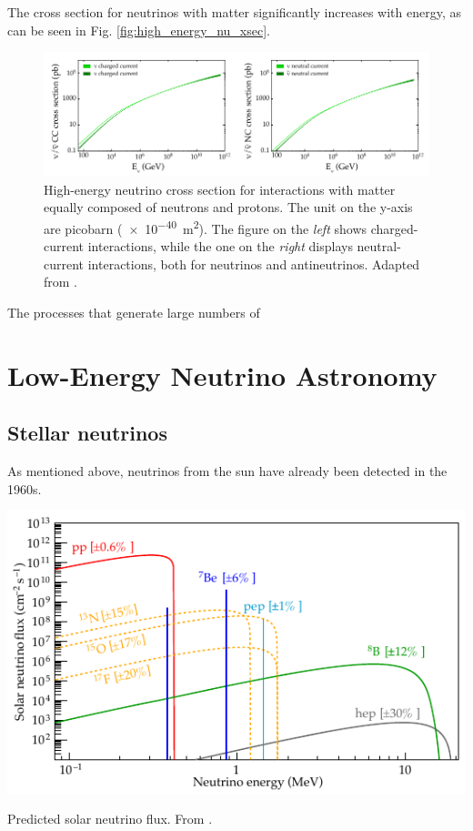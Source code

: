 \documentclass[
    a4paper, %
    fontsize=10pt, %
    twoside=false, %
    numbers=noenddot, %
    fontmethod=tex,
]{kaobook}
\begin{document}
The cross section for neutrinos with matter significantly increases with energy, as can be seen in Fig. \ref{fig:high_energy_nu_xsec}.
\begin{figure}[htb]
    \includegraphics{theory/high_energy_nu_xsec.pdf}
    \caption[High-energy neutrino cross section]{High-energy neutrino cross section for interactions with matter equally composed of neutrons and protons. The unit on the y-axis are picobarn (\SI{e-40}{\m\squared}). The figure on the \textit{left} shows charged-current interactions, while the one on the \textit{right} displays neutral-current interactions, both for neutrinos and antineutrinos. Adapted from \cite{CooperSarkar2011}.}
\end{figure}

The processes that generate large numbers of 

\section{Low-Energy Neutrino Astronomy}

\subsection{Stellar neutrinos}
As mentioned above, neutrinos from the sun have already been detected in the 1960s.

\begin{marginfigure}
    \includegraphics{theory/solar_neutrinos.pdf}
    \caption[Predicted solar neutrino flux]{Predicted solar neutrino flux. From \cite{Agostini2018}.}
\end{marginfigure}
\end{document}
